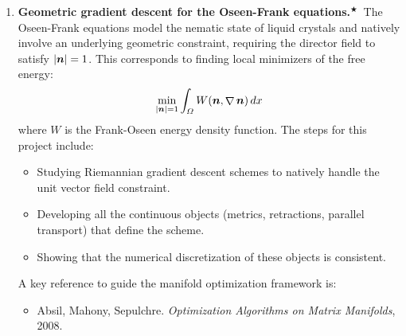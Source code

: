 \documentclass{article}
\renewcommand{\vec}{\vectorsym}
\DeclareMathOperator{\grad}{\nabla}
\newcommand{\master}{$^\bigstar$}
\begin{document}
\begin{enumerate}
    \item \textbf{Geometric gradient descent for the Oseen-Frank equations.}\master\ The Oseen-Frank equations model the nematic state of liquid crystals and natively involve an underlying geometric constraint, requiring the director field to satisfy $|\vec n| = 1$. This corresponds to finding local minimizers of the free energy:
        $$ \min_{|\vec n| = 1} \int_\Omega W(\vec n, \grad \vec n) \, dx $$
        where $W$ is the Frank-Oseen energy density function. 
        The steps for this project include:
        \begin{itemize}
            \item Studying Riemannian gradient descent schemes to natively handle the unit vector field constraint.
            \item Developing all the continuous objects (metrics, retractions, parallel transport) that define the scheme.
            \item Showing that the numerical discretization of these objects is consistent.
        \end{itemize}
        A key reference to guide the manifold optimization framework is:
        \begin{itemize}
            \item Absil, Mahony, Sepulchre. \emph{Optimization Algorithms on Matrix Manifolds}, 2008.
        \end{itemize}


\end{enumerate}
\end{document}
